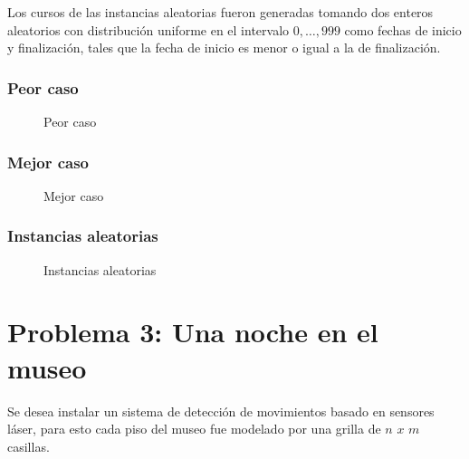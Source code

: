 \documentclass[a4paper, 10pt, twoside]{article}
\newcommand{\tresgraficos}[3]{
    \newcommand{\separacion}{-2.2em}
    \vspace{\separacion}
    
    \vspace{\separacion}
    
    \vspace{\separacion}
    
}
\begin{document}
Los cursos de las instancias aleatorias fueron generadas tomando dos enteros aleatorios con distribución uniforme en el intervalo $0, \ldots, 999$ como fechas de inicio y finalización, tales que la fecha de inicio es menor o igual a la de finalización.

\subsubsection{Peor caso}

\begin{figure}[H]
  \centering
  \tresgraficos{problema2-peor-caso}
               {problema2-peor-caso-logn}
               {problema2-peor-caso-n}               
  \caption{Peor caso}
\end{figure}


\subsubsection{Mejor caso}

\begin{figure}[H]
  \centering
  \tresgraficos{problema2-mejor-caso}
               {problema2-mejor-caso-logn}
               {problema2-mejor-caso-n}
  \caption{Mejor caso}
\end{figure}


\subsubsection{Instancias aleatorias}

\begin{figure}[H]
  \centering
  \tresgraficos{problema2-instancias-aleatorias}
               {problema2-instancias-aleatorias-logn}
               {problema2-instancias-aleatorias-n}
  \caption{Instancias aleatorias}
\end{figure}




\newpage

\section{Problema 3: Una noche en el museo}
Se desea instalar un sistema de detección de movimientos basado en sensores láser, para esto cada piso del museo fue modelado por una grilla de $n$ $x$ $m$ casillas.
\end{document}
